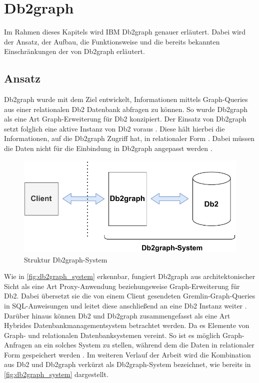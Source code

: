 \chapter{Db2graph}
\label{chap:db2graph}

Im Rahmen dieses Kapitels wird IBM Db2graph genauer erläutert. Dabei wird der Ansatz, der Aufbau, die Funktionsweise und die bereits bekannten Einschränkungen der von Db2graph erläutert. 

\section{Ansatz}
\label{db2graph:ansatz}
Db2graph wurde mit dem Ziel entwickelt, Informationen mittels Graph-Queries aus einer relationalen Db2 Datenbank abfragen zu können. So wurde Db2graph als eine Art Graph-Erweiterung für Db2 konzipiert. Der Einsatz von Db2graph setzt folglich eine aktive Instanz von Db2 voraus \cite{vldb_tian, sigmod_tian}. Diese hält hierbei die Informationen, auf die Db2graph Zugriff hat, in relationaler Form \cite{vldb_tian, sigmod_tian}. Dabei müssen die Daten nicht für die Einbindung in Db2graph angepasst werden \cite{vldb_tian, sigmod_tian}.

\begin{figure}[h]
    \centering
    \includegraphics[width=\textwidth]{images/db2graph_system.pdf}
    \vspace{0.1em}
    \caption{Struktur Db2graph-System}
    \label{fig:db2graph_system}
\end{figure}

Wie in \autoref{fig:db2graph_system} erkennbar, fungiert Db2graph aus architektonischer Sicht als eine Art Proxy-Anwendung beziehungsweise Graph-Erweiterung für Db2. Dabei übersetzt sie die von einem Client gesendeten Gremlin-Graph-Queries in SQL-An\-wei\-sung\-en und leitet diese anschließend an eine Db2 Instanz weiter \cite{vldb_tian, sigmod_tian}. Darüber hinaus können Db2 und Db2graph zusammengefasst als eine Art Hybrides Datenbankmanagementsystem betrachtet werden. Da es Elemente von Graph- und relationalen Datenbanksystemen vereint. So ist es möglich Graph-Anfragen an ein solches System zu stellen, während dem die Daten in relationaler Form gespeichert werden \cite{vldb_tian, sigmod_tian}. Im weiteren Verlauf der Arbeit wird die Kombination aus Db2 und Db2graph verkürzt als Db2graph-System bezeichnet, wie bereits in \autoref{fig:db2graph_system} dargestellt. 

